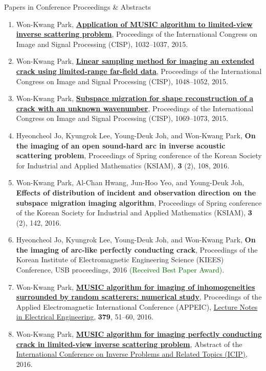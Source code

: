 \documentclass{resume} %
\begin{document}
\begin{rSection}{Papers in Conference Proceedings \& Abstracts}
\begin{enumerate}
\item\label{C-CISP2015A} Won-Kwang Park, \href{http://dx.doi.org/10.1109/CISP.2015.7408031}{\textbf{Application of MUSIC algorithm to limited-view inverse scattering problem}}, Proceedings of the  International Congress on Image and Signal Processing (CISP), 1032--1037, 2015.
\item\label{C-CISP2015B} Won-Kwang Park, \href{http://dx.doi.org/10.1109/CISP.2015.7408034}{\textbf{Linear sampling method for imaging an extended crack using limited-range far-field data}}, Proceedings of the  International Congress on Image and Signal Processing (CISP), 1048--1052, 2015.
\item\label{C-CISP2015C} Won-Kwang Park, \href{http://dx.doi.org/10.1109/CISP.2015.7408038}{\textbf{Subspace migration for shape reconstruction of a crack with an unknown wavenumber}}, Proceedings of the  International Congress on Image and Signal Processing (CISP), 1069--1073, 2015.
\item\label{C-KSIAM2016A} Hyeoncheol Jo, Kyungrok Lee, Young-Deuk Joh, and Won-Kwang Park, \textbf{On the imaging of an open sound-hard arc in inverse acoustic scattering problem}, Proceedings of Spring conference of the Korean Society for Industrial and Applied Mathematics (KSIAM), \textbf{3} (2), 108, 2016.
\item\label{C-KSIAM2016B} Won-Kwang Park, Al-Chan Hwang, Jun-Hoo Yeo, and Young-Deuk Joh, \textbf{Effects of distribution of incident and observation direction on the subspace migration imaging algorithm}, Proceedings of Spring conference of the Korean Society for Industrial and Applied Mathematics (KSIAM), \textbf{3} (2), 142, 2016.
\item\label{C-KIEES2016} Hyeoncheol Jo, Kyungrok Lee, Young-Deuk Joh, and Won-Kwang Park, \textbf{On the imaging of arc-like perfectly conducting crack}, Proceedings of the Korean Institute of Electromagnetic Engineering Science (KIEES) Conference, USB proceedings, 2016 \textcolor{darkgreen}{(Received Best Paper Award)}.
\item\label{C-APPEIC2016} Won-Kwang Park, \textbf{\href{http://dx.doi.org/10.1007/978-3-319-30117-4_5}{MUSIC algorithm for imaging of inhomogeneities surrounded by random scatterers: numerical study}}, Proceedings of the  Applied Electromagnetic International Conference (APPEIC), \href{http://www.springer.com/series/7818}{Lecture Notes in Electrical Engineering}, \textbf{379}, 51--60, 2016.
\item\label{C-ICIP2016} Won-Kwang Park, \href{http://math.ewha.ac.kr/icip2016/UpLoad/parkwk=kookmin=ac-0.pdf}{\textbf{MUSIC algorithm for imaging perfectly conducting crack in limited-view inverse scattering problem}}, Abstract of the \href{http://math.ewha.ac.kr/icip2016/}{ International Conference on Inverse Problems and Related Topics (ICIP)}, 2016.

\end{enumerate}
\end{rSection}
\end{document}
